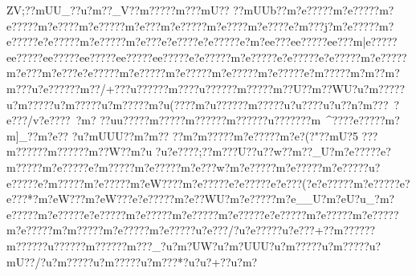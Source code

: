 {{{{{{{{{{{{{{{{{{{{{{{{{{{{{{{{{{{{{{{{{{{{{{{{{{{{{{{{{{{{{{{{{{{{{{{{{{{{{{{{{{{{{{{{{{{{{{{{{{{{{{{{{{{{{{{{{{{{{{{{{{{{{{{{{{{{{{{{{{{{{{{{{{{{{{{{{{{{{{{{{{{{{{{{{{{{{{{{{{{{{{{{{{{{{{{{{{{{{{{{{{{{{{{{{{{{{{{{{{{{{{{{{{{{{{{{{{{{{{{{{{{{{{{{{{{{{{{{{{{{{{{{{{{{{{{{{{{{{{{{{{{{{{{{{{{{{{{{{{{{{{{{{{{{{{{{{{{{{{{{{{{{{{{{{{{{{{{{{{{{{{{{{{{{{{{{{{{{{{{{{{{{{{{{{{{{{{{{{{{{{{{{{{{{{{{{{{{{{{{{{{{{{{{{{{{{{{{{{{{{{{{{{{{{{{{{{{{{{{{{{{{{{{{{{{{{{{{{{{{{{{{{{{{{{{{{{{{{{{{{{{{{{{{{{{{{{{{{{{{{{{{{{{{{{{{{{{{{{{{{{{{{{{{{{{{{{{{{{{{{{{{{{{{{{{{{{{{{{{{{{{{{{{{{{{{{{{{{{{{{{{{{{{{{{{{{{{{{{{{{{{{{{{{{{{{{{{{{{{{{{{{{{{{{{{{{{{{{{{{{{{{{{{{{{{{{{{{{{{{{{{{{{{{{{{{{{{{{{{{{{{{{{{{{{{{{{{{{{{{{{{{{{{{{{{{{{{{{{{{{{{{{{{{{{{{{{{{{{{{{{{{{{{{{{{{{{{{{{{{{{{{{{{{{{{{{{{{{{{{{{{{{{{{{{{{{{{{{{{{{{{{{{{{{{{{{{{{{{{{{{{{{{{{{{{{{{{{{{{{{{{{{{{{{{{{{{{{{{{{{{{{{{{{{{{{{{{{{{{{{{{{{{{{{{{{{{{{{{{{{{{{{{{{{{{{{{{{{{{{{ZV;??mUU_??u?m??_V?}?m????}?m{??}?mU?? ?}?mUUb??m?e?????m?e?????m?e?????m?e????m?e?????m?e???m?e?????m?e????m?e????{e?m???j?m?e?????m?e?????e?e?????m?e?????m?e???e?e????e?e?????e?m   ?e{e???e{e?????e{e???m|e?????e{e?????e{e?????e{e?????e{e?????e{e?????e?e?????m?e?????e?e?????e?e?????m?e?????m?e???m?e???e?e?????m?e?????m?e?????m?e?????m?e?????e?m?????m?m??m?m???u?e?????}?m??/+???u?????}?m   ????u??????m ?????m??U?}?m??WU?u?m?????u?m?????u?m?????u?m?????m?u(????m?u?????}?m?????u?u????u?u??n?m???~?e???/v?e????~?m?%
?}?uu????}?m????}?m?????}?m??????u???????m~^????e?????m?m]_??m?e??  ?u?mUUU??m?m??
??m?m?????m?e?????m?e?(?"?}?mU?5%
  ??}?m?????}?m?????}?m??W??m?u  
?u?e????;??m???U??u??w??m??_U?m?e?????e?m?????m?e?????e?m?????m?e?????m?e???w?m?e?????m?e?????m?e?????u?e?????e?m?????m?e?????m?eW????m?e?????e?e?????e?e???(?e?e?????m?e?????e?e???*?m?e}W???m?eW???e?e?????m?e??WU?m?e?????m?e__U?m?eU?u_?m?e?????m?e?????e?e?????m?e?????m?e?????m?e?????e?e?????m?e?????m?e?????m?e?????m?m?????m?e?????m?e?????u?e???/?u?e?????u?e???+?}?m?????}?m?????}?u?????}?m?????}?m???_?u?m?UW?u?m?UUU?u?m?????u?m?????u?mU??/?u?m?????u?m?????u?m???*?u?u?+??u?m?
}}}}}}}}}}}}}}}}}}}}}}}}}}}}}}}}}}}}}}}}}}}}}}}}}}}}}}}}}}}}}}}}}}}}}}}}}}}}}}}}}}}}}}}}}}}}}}}}}}}}}}}}}}}}}}}}}}}}}}}}}}}}}}}}}}}}}}}}}}}}}}}}}}}}}}}}}}}}}}}}}}}}}}}}}}}}}}}}}}}}}}}}}}}}}}}}}}}}}}}}}}}}}}}}}}}}}}}}}}}}}}}}}}}}}}}}}}}}}}}}}}}}}}}}}}}}}}}}}}}}}}}}}}}}}}}}}}}}}}}}}}}}}}}}}}}}}}}}}}}}}}}}}}}}}}}}}}}}}}}}}}}}}}}}}}}}}}}}}}}}}}}}}}}}}}}}}}}}}}}}}}}}}}}}}}}}}}}}}}}}}}}}}}}}}}}}}}}}}}}}}}}}}}}}}}}}}}}}}}}}}}}}}}}}}}}}}}}}}}}}}}}}}}}}}}}}}}}}}}}}}}}}}}}}}}}}}}}}}}}}}}}}}}}}}}}}}}}}}}}}}}}}}}}}}}}}}}}}}}}}}}}}}}}}}}}}}}}}}}}}}}}}}}}}}}}}}}}}}}}}}}}}}}}}}}}}}}}}}}}}}}}}}}}}}}}}}}}}}}}}}}}}}}}}}}}}}}}}}}}}}}}}}}}}}}}}}}}}}}}}}}}}}}}}}}}}}}}}}}}}}}}}}}}}}}}}}}}}}}}}}}}}}}}}}}}}}}}}}}}}}}}}}}}}}}}}}}}}}}}}}}}}}}}}}}}}}}}}}}}}}}}}}}}}}}}}}}}}}}}}}}}}}}}}}}}}}}}}}}}}}}}}}}}}}}}}}}}}}}}}}}}}}}}}}}}}}}}}}}}}}}}}}}}}}}}}}}}}}}}}}}}}}}}}}}}}}}}}}}}}}}}}}}}}}}}}}}}}}}}}}}}}}}}}}}}}}}}}}}}}}}}}}}}}
